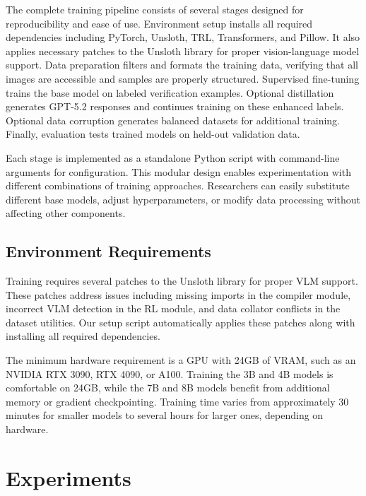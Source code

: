 \documentclass[11pt,a4paper]{article}
\begin{document}
The complete training pipeline consists of several stages designed for reproducibility and ease of use. Environment setup installs all required dependencies including PyTorch, Unsloth, TRL, Transformers, and Pillow. It also applies necessary patches to the Unsloth library for proper vision-language model support. Data preparation filters and formats the training data, verifying that all images are accessible and samples are properly structured. Supervised fine-tuning trains the base model on labeled verification examples. Optional distillation generates GPT-5.2 responses and continues training on these enhanced labels. Optional data corruption generates balanced datasets for additional training. Finally, evaluation tests trained models on held-out validation data.

Each stage is implemented as a standalone Python script with command-line arguments for configuration. This modular design enables experimentation with different combinations of training approaches. Researchers can easily substitute different base models, adjust hyperparameters, or modify data processing without affecting other components.

\subsection{Environment Requirements}

Training requires several patches to the Unsloth library for proper VLM support. These patches address issues including missing imports in the compiler module, incorrect VLM detection in the RL module, and data collator conflicts in the dataset utilities. Our setup script automatically applies these patches along with installing all required dependencies.

The minimum hardware requirement is a GPU with 24GB of VRAM, such as an NVIDIA RTX 3090, RTX 4090, or A100. Training the 3B and 4B models is comfortable on 24GB, while the 7B and 8B models benefit from additional memory or gradient checkpointing. Training time varies from approximately 30 minutes for smaller models to several hours for larger ones, depending on hardware.


\section{Experiments}
\end{document}
